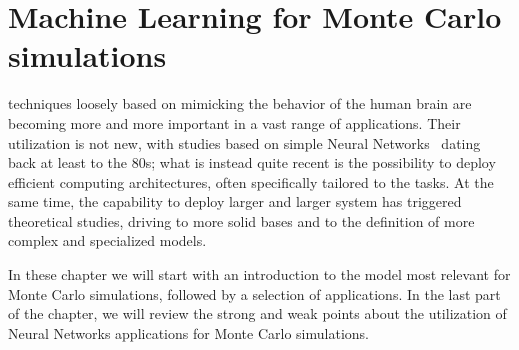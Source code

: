 \chapter{Machine Learning for Monte Carlo simulations}
 techniques loosely based on mimicking the behavior of the human brain are becoming more and more important in a vast range of applications.
Their utilization is not new, with studies based on simple Neural Networks~\cite{nn1,nn2,nn3} dating back at least to the 80s; what is instead quite recent is the possibility to deploy efficient computing architectures, often specifically tailored to the tasks.
At the same time, the capability to deploy larger and larger system has triggered theoretical studies, driving to more solid bases and to  the definition of more complex and specialized models.

In these chapter we will start with an introduction to the model most relevant for Monte Carlo simulations, followed by a selection of applications. In the last part of the chapter, we will review the strong and weak points about the utilization of Neural Networks applications for Monte Carlo simulations.
